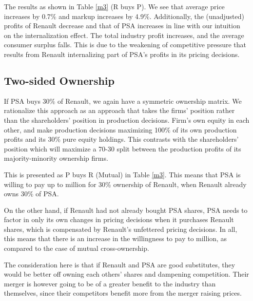 \documentclass[a4paper,12pt]{article}
\begin{document}
The results as shown in Table \ref{m3} (R buys P). We see that average price increases by 0.7\% and markup increases by 4.9\%. Additionally, the (unadjusted) profits of Renault decrease and that of PSA increases in line with our intuition on the internalization effect. The total industry profit increases, and the average consumer surplus falls. This is due to the weakening of competitive pressure that results from Renault internalizing part of PSA's profits in its pricing decisions.

\subsection{Two-sided Ownership}

If PSA buys 30\% of Renault, we again have a symmetric ownership matrix. We rationalize this approach as an approach that takes the firms' position rather than the shareholders' position in production decisions. Firm's own equity in each other, and make production decisions maximizing 100\% of its own production profits and its 30\% pure equity holdings. This contrasts with the shareholders' position which will maximize a 70-30 split between the production profits of its majority-minority ownership firms.

This is presented as P buys R (Mutual) in Table \ref{m3}. This means that PSA is willing to pay up to  million for 30\% ownership of Renault, when Renault already owns 30\% of PSA.

On the other hand, if Renault had not already bought PSA shares, PSA needs to factor in only its own changes in pricing decisions when it purchases Renault shares, which is compensated by Renault's unfettered pricing decisions. In all, this means that there is an increase in the willingness to pay to  million, as compared to the case of mutual cross-ownership.

The consideration here is that if Renault and PSA are good substitutes, they would be better off owning each others' shares and dampening competition. Their merger is however going to be of a greater benefit to the industry than themselves, since their competitors benefit more from the merger raising prices.
\end{document}
